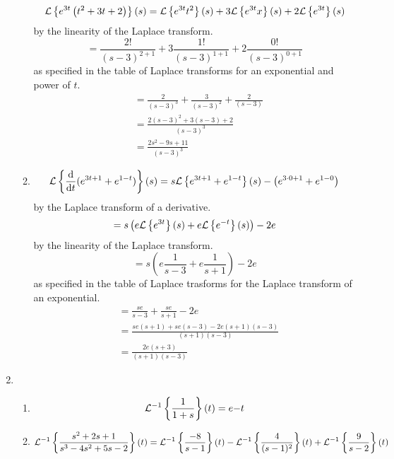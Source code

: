 \begin{enumerate}[label=\arabic*.]
\begin{enumerate}[label = (\alph*)]
\begin{equation*}
					\mathcal{L}\left\{ e^{3t}\left(t^2+3t+2\right) \right\}\left(s\right) = \mathcal{L}\left\{ e^{3t}t^2 \right\}\left(s\right) + 3\mathcal{L}\left\{ e^{3t}x \right\}\left(s\right) + 2\mathcal{L}\left\{ e^{3t} \right\}\left(s\right)
				\end{equation*}
				by the linearity of the Laplace transform.
				\begin{equation*}
					 = \frac{2!}{(s-3)^{2+1}} + 3\frac{1!}{(s-3)^{1+1}} + 2\frac{0!}{(s-3)^{0+1}}
				\end{equation*}
				as specified in the table of Laplace transforms for an exponential and power of $t$.
				\begin{align*}
					 &= \frac{2}{(s-3)^3} + \frac{3}{(s-3)^2} + \frac{2}{(s-3)} \\
					 &= \frac{2(s-3)^2 + 3(s-3) + 2}{(s-3)^3} \\
					 &= \frac{2s^2 - 9s + 11}{(s-3)^3}
				\end{align*}
			\item
				\begin{equation*}
					\mathcal{L}\left\{ \frac{\mathrm{d}}{\mathrm{d} t}{(e^{3t+1} + e^{1-t})} \right\}\left(s\right) = s\mathcal{L}\left\{ e^{3t+1} + e^{1-t} \right\}\left(s\right) - \left(e^{3\cdot 0 + 1} + e^{1-0}\right)
				\end{equation*}
				by the Laplace transform of a derivative.
				\begin{equation*}
					= s\left(e\mathcal{L}\left\{ e^{3t} \right\}\left(s\right) + e\mathcal{L}\left\{ e^{-t} \right\}\left(s\right)\right) - 2e
				\end{equation*}
				by the linearity of the Laplace transform.
				\begin{equation*}
					 = s\left(e\frac{1}{s-3} + e\frac{1}{s+1}\right) - 2e
				\end{equation*}
				as specified in the table of Laplace trasforms for the Laplace transform of an exponential.
				\begin{align*}
					&= \frac{se}{s-3} + \frac{se}{s+1} - 2e \\
					&= \frac{se(s+1) + se(s-3) -2e(s+1)(s-3)}{(s+1)(s-3)} \\
					&= \frac{2e(s+3)}{(s+1)(s-3)}
				\end{align*}
		\end{enumerate}
	\item
		\begin{enumerate}[label=(\alph*)]
			\item 
				\begin{equation*}
					\mathcal{L}^{-1}\left\{ \frac{1}{1+s} \right\}\left(t\right) = e{-t}
				\end{equation*}
			\item
				\begin{align*}
					\inverseLaplace{\frac{s^2+2s+1}{s^3-4s^2+5s-2}} &= \inverseLaplace{\frac{-8}{s-1}}-\inverseLaplace{\frac{4}{(s-1)^2}}+\inverseLaplace{\frac{9}{s-2}} \\

\end{align*}
\end{enumerate}
\end{enumerate}
